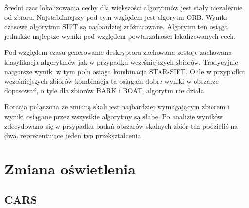 Średni czas lokalizowania cechy dla większości algorytmów jest stały niezależnie od zbioru. Najstabilniejszy pod tym względem jest algorytm ORB. Wyniki czasowe algorytmu SIFT są najbardziej zróżnicowane. Algorytm ten osiąga jednakże najlepsze wyniki pod względem powtarzalności lokalizowanych cech.

Pod względem czasu generowanie deskryptora zachowana zostaje zachowana klasyfikacja algorytmów jak w przypadku wcześniejszych zbiorów. Tradycyjnie najgorsze wyniki w tym polu osiąga kombinacja STAR-SIFT. O ile w przypadku wcześniejszych zbiorów kombinacja ta osiągała dobre wyniki w obszarze dopasowań, o tyle dla zbiorów BARK i BOAT, algorytm nie działa.

Rotacja połączona ze zmianą skali jest najbardziej wymagającym zbiorem i wyniki osiągane przez wszystkie algorytmy są słabe. Po analizie wyników zdecydowano się w przypadku badań obszarów skalnych zbiór ten podzielić na dwa, reprezentujące jeden typ przekształcenia.



\FloatBarrier
\section{Zmiana oświetlenia}
\subsection{CARS}

